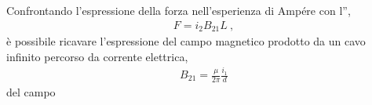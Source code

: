 \documentclass[letterpaper,10pt,italian]{jupyterBook}
\begin{document}
\sphinxAtStartPar
Confrontando l’espressione della forza nell’esperienza di Ampére con l”{\hyperref[\detokenize{ch/electromagnetism/electromagnetism-steady:physics-hs-electromagnetism-electromagnetism-steady-experience-faraday}]{}},
\begin{equation*}
\begin{split}F = i_2 B_{21} L \ ,\end{split}
\end{equation*}
\sphinxAtStartPar
è possibile ricavare l’espressione del campo magnetico prodotto da un cavo infinito percorso da corrente elettrica,
\begin{equation*}
\begin{split}B_{21} = \frac{\mu}{2 \pi} \frac{i_1}{d}\end{split}
\end{equation*}
\sphinxAtStartPar
{}  del campo

\sphinxAtStartPar
{} 
\end{document}
